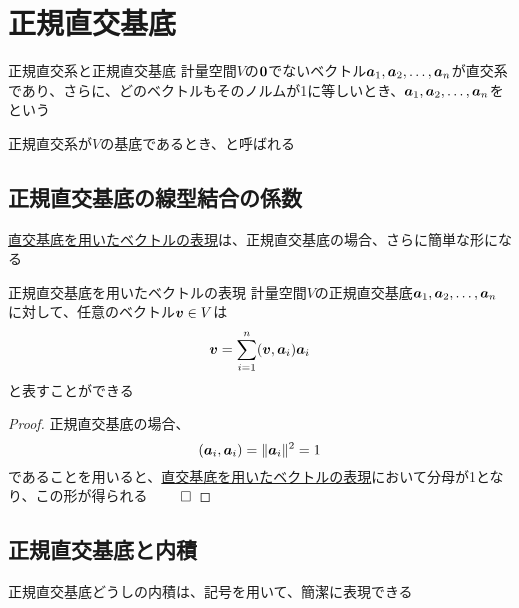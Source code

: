 \documentclass[../../../topic_linear-algebra]{subfiles}
\begin{document}
\sectionline
\section{正規直交基底}

\begin{definition}{正規直交系と正規直交基底}
  計量空間$V$の$\vb*{0}$でないベクトル$\vb*{a}_1, \vb*{a}_2, \ldots, \vb*{a}_n$が直交系であり、さらに、どのベクトルもそのノルムが1に等しいとき、$\vb*{a}_1, \vb*{a}_2, \ldots, \vb*{a}_n$をという

  正規直交系が$V$の基底であるとき、と呼ばれる
\end{definition}

\subsection{正規直交基底の線型結合の係数}

\hyperref[thm:vector-expansion-by-orthogonal-basis]{直交基底を用いたベクトルの表現}は、正規直交基底の場合、さらに簡単な形になる

\begin{theorem}{正規直交基底を用いたベクトルの表現}\label{thm:expansion-in-orthonormal-basis}
  計量空間$V$の正規直交基底$\vb*{a}_1, \vb*{a}_2, \ldots, \vb*{a}_n$に対して、任意のベクトル$\vb*{v} \in V$は
  \begin{equation*}
    \vb*{v} = \sum_{i=1}^n (\vb*{v}, \vb*{a}_i) \vb*{a}_i
  \end{equation*}
  と表すことができる
\end{theorem}

\begin{proof}
  正規直交基底の場合、
  \begin{equation*}
    (\vb*{a}_i,\vb*{a}_i) = \|\vb*{a}_i\|^2 = 1
  \end{equation*}
  であることを用いると、\hyperref[thm:vector-expansion-by-orthogonal-basis]{直交基底を用いたベクトルの表現}において分母が1となり、この形が得られる $\qed$
\end{proof}

\subsection{正規直交基底と内積}

正規直交基底どうしの内積は、記号を用いて、簡潔に表現できる
\end{document}
